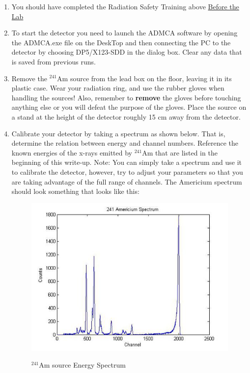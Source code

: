 \documentclass{../lab}
\begin{document}
\begin{enumerate}
    \item You should have completed the Radiation Safety Training above \hyperref[sec:BeforeTheLab]{Before the Lab}

    \item To start the detector you need to launch the ADMCA software by opening the ADMCA.exe file on the DeskTop and then connecting the PC to the detector by choosing DP5/X123-SDD in the dialog box. Clear any data that is saved from previous runs.

    \item Remove the $^{241}$Am source from the lead box on the floor, leaving it in its plastic case. Wear your radiation ring, and use the rubber gloves when handling the sources! Also, remember to \textbf{remove} the gloves before touching anything else or you will defeat the purpose of the gloves. Place the source on a stand at the height of the detector roughly 15 cm away from the detector.

    \item Calibrate your detector by taking a spectrum as shown below. That is, determine the relation between energy and channel numbers. Reference the known energies of the x-rays emitted by $^{241}$Am that are listed in the beginning of this write-up. Note: You can simply take a spectrum and use it to calibrate the detector, however, try to adjust your parameters so that you are taking advantage of the full range of channels. The Americium spectrum should look something that looks like this:
    \begin{figure}[h]
        \centering
        \href{http://experimentationlab.berkeley.edu/sites/default/files/images/550px-COMimage02.jpg}{\includegraphics[width=0.8\linewidth]{images/550px-COMimage02.jpg}}
        \caption{$^{241}$Am source Energy Spectrum}
        \label{fig:550px-COMimage02}
    \end{figure}
 

\end{enumerate}
\end{document}
